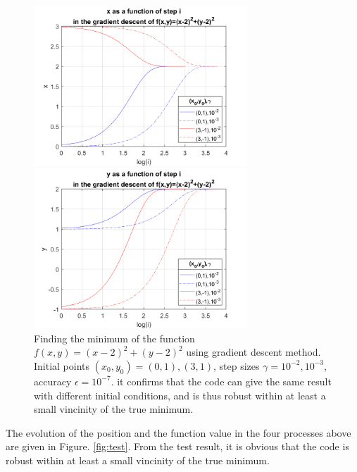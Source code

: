 \documentclass[12pt, graphicx]{article}
\begin{document}
\begin{figure}[ht]
\begin{minipage}{0.48\linewidth}
\centering
\includegraphics[width = 80mm]{test_x.png}
\end{minipage}
\begin{minipage}{0.48\linewidth}
\centering
\includegraphics[width = 80mm]{test_y.png}
\end{minipage}
\caption{Finding the minimum of the function $f(x,y)=(x-2)^2+(y-2)^2$ using gradient descent method.  Initial points $(x_0,y_0)=(0,1), (3,1)$, step sizes $\gamma=10^{-2},10^{-3}$, accuracy $\epsilon=10^{-7}$. it confirms that the code can give the same result with different initial conditions,  and is thus robust within at least a small vincinity of the true minimum.}
\label{fig:testxy}
\end{figure}

The evolution of the position and the function value in the four processes above are given in Figure. \ref{fig:test}. From the test result, it is obvious that the code is robust within at least a small vincinity of the true minimum. 
\end{document}
